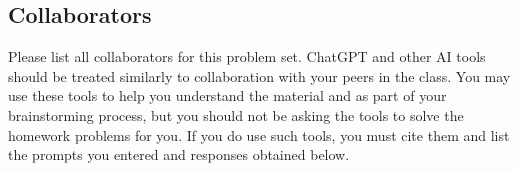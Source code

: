 \documentclass[11pt]{article}
\begin{document}
\subsection*{Collaborators}
Please list all collaborators for this problem set. ChatGPT and other AI tools should be treated similarly to collaboration with your peers in the 
class.  You may use these tools to help you understand the material and as part of your 
brainstorming process, but you should not be asking the tools to solve the homework problems 
for you. If you do use such tools, you must cite them and  list the 
prompts you entered and responses obtained below.
\end{document}
